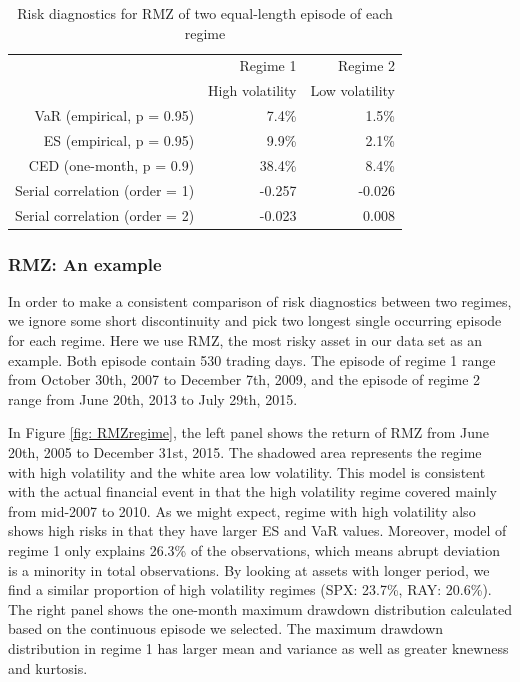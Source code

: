 \documentclass[11pt]{article}
\begin{document}
\begin{table}[H]
    \centering 
    \begin{tabular}{| r | r | r |} 
        \hline
        & Regime 1 & Regime 2 \\
        & High volatility & Low volatility \\
        \hline 
        VaR (empirical, p = 0.95) & 7.4\% & 1.5\% \\
        ES (empirical, p = 0.95) & 9.9\% & 2.1\% \\
        CED (one-month, p = 0.9) & 38.4\% & 8.4\% \\
        Serial correlation (order = 1) & -0.257 & -0.026 \\
        Serial correlation (order = 2) & -0.023 & 0.008 \\
        \hline
    \end{tabular}
    \caption{Risk diagnostics for RMZ of two equal-length episode of each regime} 
    \label{table:ridkDiagsRegimeRMZ}
\end{table}

\subsubsection{RMZ: An example}

In order to make a consistent comparison of risk diagnostics between two regimes, we ignore some short discontinuity and pick two longest single occurring episode for each regime. Here we use RMZ, the most risky asset in our data set as an example. Both episode contain 530 trading days. The episode of regime 1 range from October 30th, 2007 to December 7th, 2009, and the episode of regime 2 range from June 20th, 2013 to July 29th, 2015. 

In Figure \ref{fig: RMZregime}, the left panel shows the return of RMZ from June 20th, 2005 to December 31st, 2015. The shadowed area represents the regime with high volatility and the white area low volatility. This model is consistent with the actual financial event in that the high volatility regime covered mainly from mid-2007 to 2010. As we might expect, regime with high volatility also shows high risks in that they have larger ES and VaR values. Moreover, model of regime 1 only explains 26.3\% of the observations, which means abrupt deviation is a minority in total observations. By looking at assets with longer period, we find a similar proportion of high volatility regimes (SPX: 23.7\%, RAY: 20.6\%). The right panel shows the one-month maximum drawdown distribution calculated based on the continuous episode we selected. The maximum drawdown distribution in regime 1 has larger mean and variance as well as greater knewness and kurtosis. 
\end{document}
